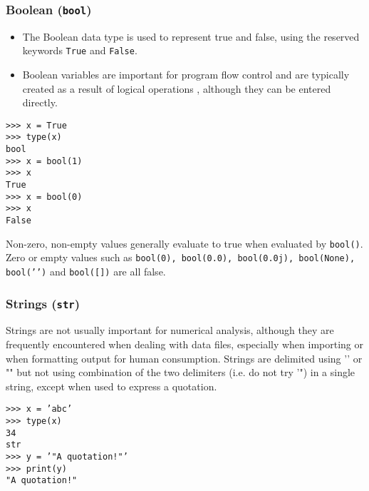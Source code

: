 \documentclass[Pydata.tex]{subfiles}
\begin{document}
\subsubsection{Boolean (\texttt{bool})}
\begin{itemize}
\item The Boolean data type is used to represent true and false, using the reserved keywords \texttt{True} and \texttt{False}.
\item Boolean variables are important for program flow control and are typically created as a
result of logical operations , although they can be entered directly.
\end{itemize}
\begin{framed}
\begin{verbatim}
>>> x = True
>>> type(x)
bool
>>> x = bool(1)
>>> x
True
>>> x = bool(0)
>>> x
False
\end{verbatim}
\end{framed}
Non-zero, non-empty values generally evaluate to true when evaluated by \texttt{bool()}. Zero or empty values
such as \texttt{bool(0), bool(0.0), bool(0.0j), bool(None), bool(’’)} and \texttt{bool([])} are all false.
\subsubsection{Strings (\texttt{str})}
\noindent Strings are not usually important for numerical analysis, although they are frequently encountered when
dealing with data files, especially when importing or when formatting output for human consumption.
Strings are delimited using ’’ or "" but not using combination of the two delimiters (i.e. do not try ’") in
a single string, except when used to express a quotation.
\begin{framed}
\begin{verbatim}
>>> x = ’abc’
>>> type(x)
34
str
>>> y = ’"A quotation!"’
>>> print(y)
"A quotation!"
\end{verbatim}
\end{framed}

\newpage
\end{document}
